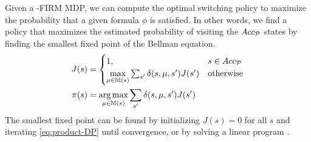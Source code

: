 \documentclass[letterpaper]{article} %
\newcommand{\sofie}[1]{{\color{purple} [Sofie] #1}}
\begin{document}
Given a \DTL-FIRM MDP, we can compute the optimal switching policy to maximize the probability that a given formula $\phi$ is satisfied.  
%
%
In other words, we find a policy that maximizes the estimated probability of visiting the $Acc_{\mathcal{P}}$ states by finding the smallest fixed point of the Bellman equation.
\begin{align}
J(s) &= \begin{cases}
1, &  s \in Acc_{\mathcal{P}} \\ 
\underset{\mu \in \mathbb{M}(s)}{\max} \sum_{s'} \delta(s,\mu,s')J(s') & \text{otherwise} 
\end{cases}  \label{eq:product-DP}\\
\pi(s) &= \underset{\mu \in \mathbb{M}(s)}{\arg \max} \sum_{s'} \delta(s,\mu,s')J(s')
\end{align}
The smallest fixed point can be  found by initializing $J(s) = 0$ for all $s$ and iterating \eqref{eq:product-DP} until convergence, or by solving a linear program \cite[Theorem 10.105]{Baier08}.
\end{document}

